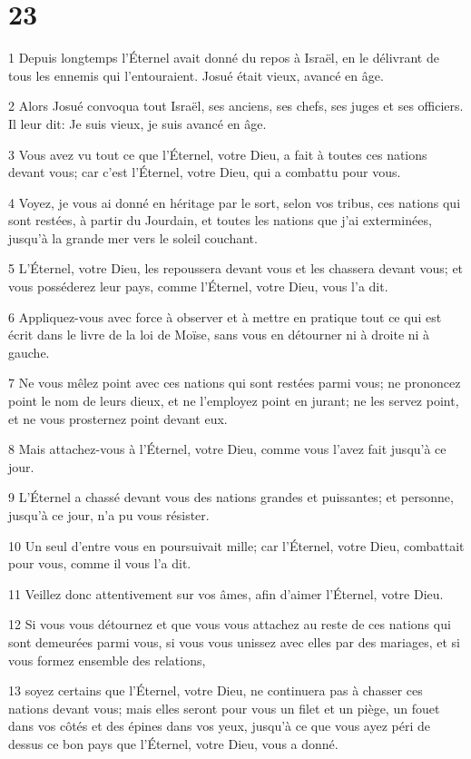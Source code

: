 \chapter{23}

\par 1 Depuis longtemps l'Éternel avait donné du repos à Israël, en le délivrant de tous les ennemis qui l'entouraient. Josué était vieux, avancé en âge.
\par 2 Alors Josué convoqua tout Israël, ses anciens, ses chefs, ses juges et ses officiers. Il leur dit: Je suis vieux, je suis avancé en âge.
\par 3 Vous avez vu tout ce que l'Éternel, votre Dieu, a fait à toutes ces nations devant vous; car c'est l'Éternel, votre Dieu, qui a combattu pour vous.
\par 4 Voyez, je vous ai donné en héritage par le sort, selon vos tribus, ces nations qui sont restées, à partir du Jourdain, et toutes les nations que j'ai exterminées, jusqu'à la grande mer vers le soleil couchant.
\par 5 L'Éternel, votre Dieu, les repoussera devant vous et les chassera devant vous; et vous posséderez leur pays, comme l'Éternel, votre Dieu, vous l'a dit.
\par 6 Appliquez-vous avec force à observer et à mettre en pratique tout ce qui est écrit dans le livre de la loi de Moïse, sans vous en détourner ni à droite ni à gauche.
\par 7 Ne vous mêlez point avec ces nations qui sont restées parmi vous; ne prononcez point le nom de leurs dieux, et ne l'employez point en jurant; ne les servez point, et ne vous prosternez point devant eux.
\par 8 Mais attachez-vous à l'Éternel, votre Dieu, comme vous l'avez fait jusqu'à ce jour.
\par 9 L'Éternel a chassé devant vous des nations grandes et puissantes; et personne, jusqu'à ce jour, n'a pu vous résister.
\par 10 Un seul d'entre vous en poursuivait mille; car l'Éternel, votre Dieu, combattait pour vous, comme il vous l'a dit.
\par 11 Veillez donc attentivement sur vos âmes, afin d'aimer l'Éternel, votre Dieu.
\par 12 Si vous vous détournez et que vous vous attachez au reste de ces nations qui sont demeurées parmi vous, si vous vous unissez avec elles par des mariages, et si vous formez ensemble des relations,
\par 13 soyez certains que l'Éternel, votre Dieu, ne continuera pas à chasser ces nations devant vous; mais elles seront pour vous un filet et un piège, un fouet dans vos côtés et des épines dans vos yeux, jusqu'à ce que vous ayez péri de dessus ce bon pays que l'Éternel, votre Dieu, vous a donné.
